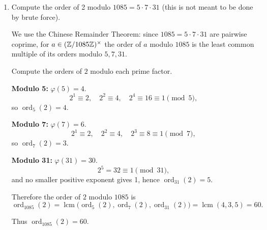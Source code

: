 \begin{enumerate}
    
  
  
  
  \item Compute the order of 2 modulo $1085=5 \cdot 7 \cdot 31$ (this is not meant to be done by brute force).
  \begin{subanswer}
    We use the Chinese Remainder Theorem: since \(1085=5\cdot7\cdot31\) are pairwise coprime, for \(a\in(\Bbb Z/1085\Bbb Z)^\times\) the order of \(a\) modulo \(1085\) is the least common multiple of its orders modulo \(5,7,31\).
    
    Compute the orders of \(2\) modulo each prime factor.
    
    \textbf{Modulo 5:} \(\varphi(5)=4\). 
    \[
    2^1\equiv2,\quad 2^2\equiv4,\quad 2^4\equiv16\equiv1\pmod5,
    \]
    so \(\operatorname{ord}_5(2)=4\).
    
    \textbf{Modulo 7:} \(\varphi(7)=6\).
    \[
    2^1\equiv2,\quad 2^2\equiv4,\quad 2^3\equiv8\equiv1\pmod7,
    \]
    so \(\operatorname{ord}_7(2)=3\).
    
    \textbf{Modulo 31:} \(\varphi(31)=30\).
    \[
    2^5=32\equiv1\pmod{31},
    \]
    and no smaller positive exponent gives 1, hence \(\operatorname{ord}_{31}(2)=5\).
    
    Therefore the order of \(2\) modulo \(1085\) is
    \[
    \operatorname{ord}_{1085}(2)=\operatorname{lcm}\big(\operatorname{ord}_5(2),\operatorname{ord}_7(2),\operatorname{ord}_{31}(2)\big)
    =\operatorname{lcm}(4,3,5)=60.
    \]
    
    Thus \(\boxed{\operatorname{ord}_{1085}(2)=60.}\)
    \end{subanswer}
    

\end{enumerate}
























































